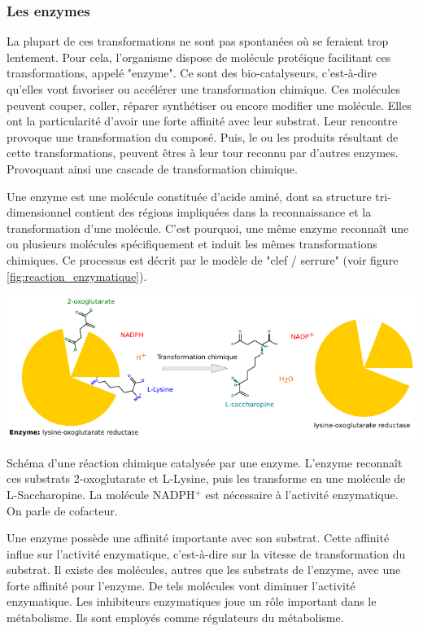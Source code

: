 \begin{refsection}
    \subsubsection{Les enzymes}    
    La plupart de ces transformations ne sont pas spontanées où se feraient trop lentement. Pour cela, l'organisme dispose de molécule protéique facilitant ces transformations, appelé "enzyme". Ce sont des bio-catalyseurs, c'est-à-dire qu'elles vont favoriser ou accélérer une transformation chimique. Ces molécules peuvent couper, coller, réparer synthétiser ou encore modifier une molécule. Elles ont la particularité d'avoir une forte affinité avec leur substrat.  Leur rencontre provoque une transformation du composé. Puis, le ou les produits résultant de cette transformations, peuvent êtres à leur tour reconnu par d'autres enzymes. Provoquant ainsi une cascade de transformation chimique. 
    
    Une enzyme est une molécule constituée d'acide aminé, dont sa structure tri-dimensionnel contient des régions impliquées dans la reconnaissance et la transformation d’une molécule. C'est pourquoi, une même enzyme reconnaît une ou plusieurs molécules spécifiquement et induit les mêmes transformations chimiques. Ce processus est décrit par le modèle de "clef / serrure" (voir figure \ref{fig:reaction_enzymatique}).
    
    \begin{shadedfigure}
        \centering
        \includegraphics[width=\textwidth]{img/lysine-oxoglutarate_reductase.pdf}
        \caption{Schéma d'une réaction chimique catalysée par une enzyme. L'enzyme reconnaît ces substrats 2-oxoglutarate et L-Lysine, puis les transforme en une molécule de L-Saccharopine. La molécule NADPH$^{+}$ est nécessaire à l'activité enzymatique. On parle de cofacteur.}
        \label{fig:reaction_enzymatique}
    \end{shadedfigure}
    
    Une enzyme possède une affinité importante avec son substrat. Cette affinité influe sur l’activité enzymatique, c’est-à-dire sur la vitesse de transformation du substrat. Il existe des molécules, autres que les substrats de l’enzyme,  avec  une forte affinité pour l’enzyme. De tels molécules vont diminuer l’activité enzymatique. Les inhibiteurs enzymatiques joue un rôle important dans le métabolisme. Ils sont employés comme régulateurs du métabolisme. 
    

\end{refsection}
